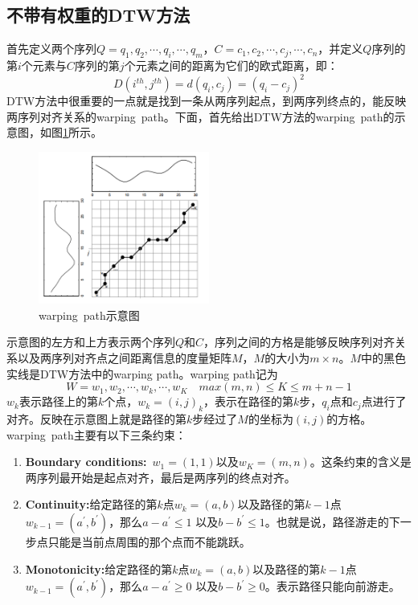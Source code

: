 \subsection{不带有权重的DTW方法}
首先定义两个序列$Q=q_1,q_2,\cdots,q_i,\cdots,q_m$，$C=c_1,c_2,\cdots,c_j,\cdots,c_n$，并定义$Q$序列的第$i$个元素与$C$序列的第$j$个元素之间的距离为它们的欧式距离，即：
\begin{equation}\label{equ:2}
  D\left( {{i^{th}},{j^{th}}} \right) = d\left( {{q_i},{c_j}} \right) = {\left( {{q_i} - {c_j}} \right)^2}
\end{equation}
DTW方法中很重要的一点就是找到一条从两序列起点，到两序列终点的，能反映两序列对齐关系的warping\ path。下面，首先给出DTW方法的warping\ path的示意图，如图\ref{fig:5}所示。
\begin{figure}[h]
  \centering
  \includegraphics[width=0.5\textwidth]{./figure/three_way_plot.png}
  \caption{warping\ path示意图}\label{fig:5}
\end{figure}
示意图的左方和上方表示两个序列$Q$和$C$，序列之间的方格是能够反映序列对齐关系以及两序列对齐点之间距离信息的度量矩阵$M$，$M$的大小为$m \times n$。$M$中的黑色实线是DTW方法中的warping path。warping path记为
\begin{equation}\label{equ:3}
  W = w_1,w_2,\cdots,w_k,\cdots,w_K \quad max(m,n) \leq K \leq m+n-1
\end{equation}
$w_k$表示路径上的第$k$个点，$w_k={(i,j)}_k$，表示在路径的第$k$步，$q_i$点和$c_j$点进行了对齐。反映在示意图上就是路径的第$k$步经过了$M$的坐标为$(i,j)$的方格。
warping\ path主要有以下三条约束：
\begin{enumerate}
  \item \textbf{Boundary conditions:}\ $w_1=(1,1)$以及$w_K=(m,n)$。这条约束的含义是两序列最开始是起点对齐，最后是两序列的终点对齐。
  \item \textbf{Continuity:}给定路径的第$k$点$w_k=(a,b)$以及路径的第$k-1$点$w_{k-1}=(a^{'},b^{'})$，那么$a-a^{'} \leq 1$ 以及$b-b^{'} \leq 1$。也就是说，路径游走的下一步点只能是当前点周围的那个点而不能跳跃。
  \item \textbf{Monotonicity:}给定路径的第$k$点$w_k=(a,b)$以及路径的第$k-1$点$w_{k-1}=(a^{'},b^{'})$，那么$a-a^{'} \geq 0$ 以及$b-b^{'} \geq 0$。表示路径只能向前游走。
\end{enumerate}

